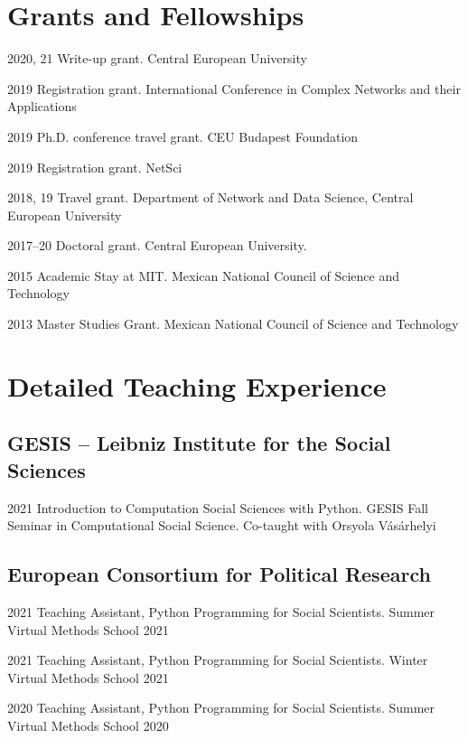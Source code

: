 \documentclass{academiccv}
\begin{document}
\section*{Grants and Fellowships}
\begin{tablist}
	\item[2020, 21] \tab Write-up grant. Central European University 
	\item[2019] \tab Registration grant. International Conference in Complex Networks and their Applications
	\item[2019] \tab Ph.D. conference travel grant. CEU Budapest Foundation
	\item[2019] \tab Registration grant. NetSci 
	\item[2018, 19] \tab Travel grant. Department of Network and Data Science, Central European University
	\item[2017--20] \tab Doctoral grant. Central European University. 
	\item[2015] \tab Academic Stay at MIT. Mexican National Council of Science and Technology
	\item[2013] \tab Master Studies Grant. Mexican National Council of Science and Technology
\end{tablist}

\section*{Detailed Teaching Experience}
\subsection*{GESIS – Leibniz Institute for the Social Sciences}
\begin{tablist}
	\item[2021] \tab  Introduction to Computation Social Sciences with Python. GESIS Fall Seminar in Computational Social Science. Co-taught with Orsyola Vásárhelyi
\end{tablist}

\subsection*{European Consortium for Political Research}
\begin{tablist}
	\item[2021] \tab Teaching Assistant, Python Programming for Social Scientists. Summer Virtual Methods School 2021
	\item[2021] \tab Teaching Assistant, Python Programming for Social Scientists. Winter Virtual Methods School 2021
	\item[2020] \tab Teaching Assistant, Python Programming for Social Scientists. Summer Virtual Methods School 2020
\end{tablist}
\end{document}
